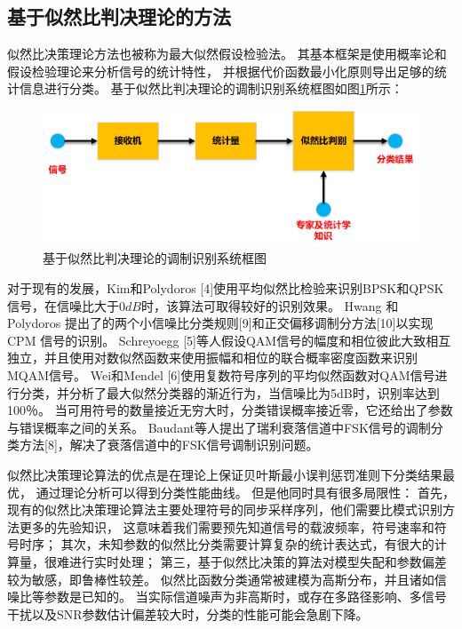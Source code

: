 \subsection{基于似然比判决理论的方法}

似然比决策理论方法也被称为最大似然假设检验法。 
其基本框架是使用概率论和假设检验理论来分析信号的统计特性，
并根据代价函数最小化原则导出足够的统计信息进行分类。
基于似然比判决理论的调制识别系统框图如图\ref{sec:fig_1_0}所示：\par
\begin{figure}
	\centering
	\includegraphics[scale=0.55]{figures/chapter_1/fig_1_0}
	\caption{基于似然比判决理论的调制识别系统框图} \label{sec:fig_1_0}
\end{figure}
对于现有的发展，Kim和Polydoros [4]使用平均似然比检验来识别BPSK和QPSK信号，在信噪比大于$0dB$时，该算法可取得较好的识别效果。
Hwang 和 Polydoros 提出了的两个小信噪比分类规则[9]和正交偏移调制分方法[10]以实现 CPM 信号的识别。
Schreyoegg [5]等人假设QAM信号的幅度和相位彼此大致相互独立，并且使用对数似然函数来使用振幅和相位的联合概率密度函数来识别MQAM信号。 
Wei和Mendel [6]使用复数符号序列的平均似然函数对QAM信号进行分类，并分析了最大似然分类器的渐近行为，当信噪比为5dB时，识别率达到100％。
当可用符号的数量接近无穷大时，分类错误概率接近零，它还给出了参数与错误概率之间的关系。
Baudant等人提出了瑞利衰落信道中FSK信号的调制分类方法[8]，解决了衰落信道中的FSK信号调制识别问题。\par
 
似然比决策理论算法的优点是在理论上保证贝叶斯最小误判惩罚准则下分类结果最优，
通过理论分析可以得到分类性能曲线。
但是他同时具有很多局限性：
首先，现有的似然比决策理论算法主要处理符号的同步采样序列，他们需要比模式识别方法更多的先验知识，
这意味着我们需要预先知道信号的载波频率，符号速率和符号时序；
其次，未知参数的似然比分类需要计算复杂的统计表达式，有很大的计算量，很难进行实时处理；
第三，基于似然比决策的算法对模型失配和参数偏差较为敏感，即鲁棒性较差。
似然比函数分类通常被建模为高斯分布，并且诸如信噪比等参数是已知的。
当实际信道噪声为非高斯时，或存在多路径影响、多信号干扰以及SNR参数估计偏差较大时，分类的性能可能会急剧下降。\par
 
